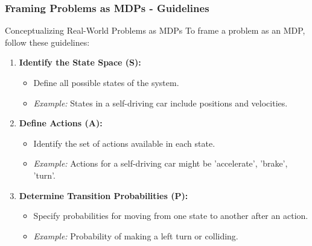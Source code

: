 \documentclass{beamer}
\begin{document}
\begin{frame}[fragile]
    \frametitle{Framing Problems as MDPs - Guidelines}
    \begin{block}{Conceptualizing Real-World Problems as MDPs}
        To frame a problem as an MDP, follow these guidelines:
    \end{block}
    \begin{enumerate}
        \item \textbf{Identify the State Space (S):}
            \begin{itemize}
                \item Define all possible states of the system.
                \item \textit{Example:} States in a self-driving car include positions and velocities.
            \end{itemize}
        
        \item \textbf{Define Actions (A):}
            \begin{itemize}
                \item Identify the set of actions available in each state.
                \item \textit{Example:} Actions for a self-driving car might be 'accelerate', 'brake', 'turn'.
            \end{itemize}
        
        \item \textbf{Determine Transition Probabilities (P):}
            \begin{itemize}
                \item Specify probabilities for moving from one state to another after an action.
                \item \textit{Example:} Probability of making a left turn or colliding.
            \end{itemize}
    \end{enumerate}
\end{frame}
\end{document}
